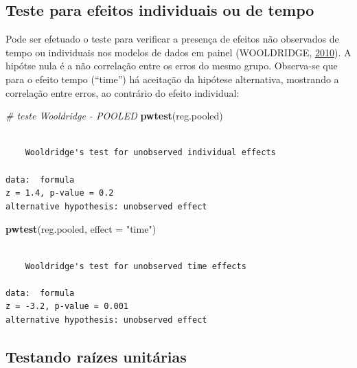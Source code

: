 \documentclass[12pt,brazil,oneside]{book}
\newenvironment{Shaded}{\begin{snugshade}}{\end{snugshade}}
\newcommand{\CommentTok}[1]{\textcolor[rgb]{0.56,0.35,0.01}{\textit{#1}}}
\newcommand{\DataTypeTok}[1]{\textcolor[rgb]{0.13,0.29,0.53}{#1}}
\newcommand{\KeywordTok}[1]{\textcolor[rgb]{0.13,0.29,0.53}{\textbf{#1}}}
\newcommand{\NormalTok}[1]{#1}
\newcommand{\StringTok}[1]{\textcolor[rgb]{0.31,0.60,0.02}{#1}}
\begin{document}
\hypertarget{teste-para-efeitos-individuais-ou-de-tempo}{%
\subsection{Teste para efeitos individuais ou de tempo}\label{teste-para-efeitos-individuais-ou-de-tempo}}

Pode ser efetuado o teste para verificar a presença de efeitos não observados de tempo ou individuais nos modelos de dados em painel (WOOLDRIDGE, \protect\hyperlink{ref-wooldridge2010}{2010}). A hipótse nula é a não correlação entre os erros do mesmo grupo. Observa-se que para o efeito tempo (``time'') há aceitação da hipótese alternativa, mostrando a correlação entre erros, ao contrário do efeito individual:

\begin{Shaded}
\begin{Highlighting}[]
\CommentTok{# teste Wooldridge - POOLED}
\KeywordTok{pwtest}\NormalTok{(reg.pooled) }
\end{Highlighting}
\end{Shaded}

\begin{verbatim}

    Wooldridge's test for unobserved individual effects

data:  formula
z = 1.4, p-value = 0.2
alternative hypothesis: unobserved effect
\end{verbatim}

\begin{Shaded}
\begin{Highlighting}[]
\KeywordTok{pwtest}\NormalTok{(reg.pooled, }\DataTypeTok{effect =} \StringTok{"time"}\NormalTok{) }
\end{Highlighting}
\end{Shaded}

\begin{verbatim}

    Wooldridge's test for unobserved time effects

data:  formula
z = -3.2, p-value = 0.001
alternative hypothesis: unobserved effect
\end{verbatim}

\hypertarget{testando-raizes-unitarias}{%
\subsection{Testando raízes unitárias}\label{testando-raizes-unitarias}}
\end{document}
